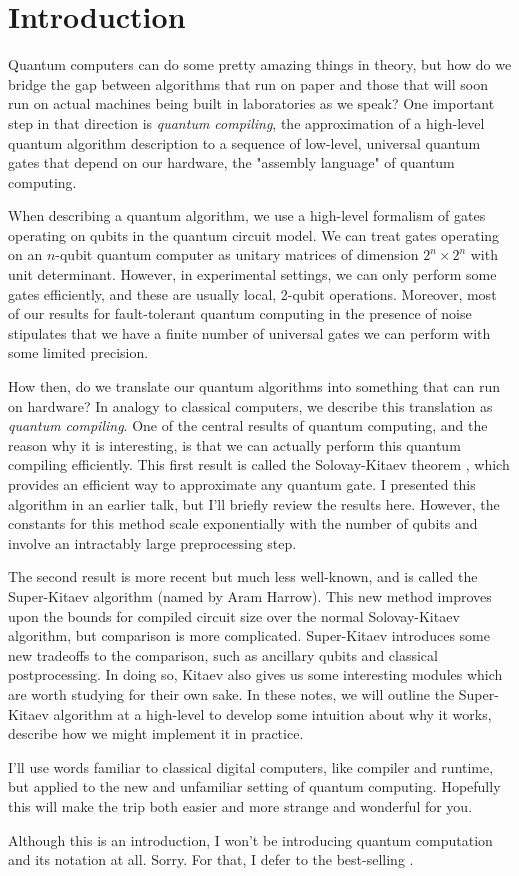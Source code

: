 \section{Introduction}

Quantum computers can do some pretty amazing things in theory, but how
do we bridge the gap between algorithms that run on paper and those that
will soon run on actual machines being built in laboratories as we speak?
One important step in that direction is \emph{quantum compiling}, the
approximation of a high-level quantum algorithm description to a sequence
of low-level, universal quantum gates that depend on our hardware, the
"assembly language" of quantum computing.

When describing a quantum algorithm, we use a high-level formalism of
gates operating on qubits in the quantum circuit model.
We can treat gates operating on an $n$-qubit quantum computer as unitary
matrices of dimension $2^n \times 2^n$ with unit determinant.
However, in experimental settings,
we can only perform some gates efficiently, and these are usually local,
2-qubit operations. Moreover, most of our results for fault-tolerant
quantum computing in the presence of noise stipulates that we have a finite
number of universal gates we can perform with some limited precision.

How then, do we translate our quantum algorithms into something that can run
on hardware? In analogy to classical computers, we describe this translation
as {\em quantum compiling}. One of the central results of quantum computing,
and the reason why it is interesting, is that we can actually perform this
quantum compiling efficiently. This first result is called the
Solovay-Kitaev theorem \cite{Dawson2005}, which provides an efficient way to
approximate any quantum gate. I presented this algorithm in an earlier talk, but
I'll briefly review the results here. However, the constants for this method
scale exponentially with the number of qubits and involve an intractably
large preprocessing step.

The second result is more recent but much less well-known, and is called
the Super-Kitaev algorithm (named by Aram Harrow). This new method improves upon
the bounds for compiled circuit size over the normal Solovay-Kitaev algorithm,
but comparison is more complicated. Super-Kitaev introduces some new tradeoffs to the
comparison, such as ancillary qubits and classical postprocessing. In doing so,
Kitaev also gives us some interesting modules which are worth studying for
their own sake. In these notes, we will outline the Super-Kitaev algorithm at
a high-level to develop some intuition about why it works, describe how we 
might implement it in practice.

I'll use words familiar to classical digital computers, like compiler and
runtime, but applied to the new and unfamiliar setting of quantum computing.
Hopefully this will make the trip both easier and more strange and
wonderful for you.

Although this is an introduction, I won't be introducing quantum computation
and its notation at all. Sorry.
For that, I defer to the best-selling \cite{nc00}.